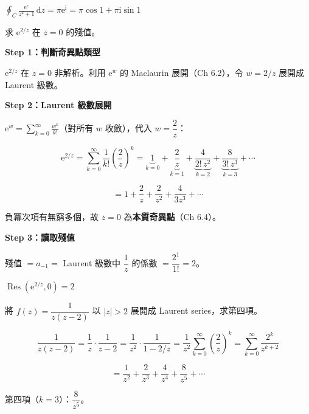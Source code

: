 \documentclass[12pt,a4paper]{article}
\newcommand{\dd}{\,\mathrm{d}}
\newcommand{\ii}{\mathrm{i}}
\newcommand{\ee}{\mathrm{e}}
\newcommand{\Res}{\operatorname{Res}}
\begin{document}
\begin{ansbox}
$\displaystyle\oint_C\frac{\ee^z}{z^2+1}\dd{z}=\boxed{\pi\ee^\ii=\pi\cos 1+\pi\ii\sin 1}$
\end{ansbox}

\begin{qbox}[第 7 題\,---\,殘值]
求 $\ee^{2/z}$ 在 $z=0$ 的殘值。
\end{qbox}

\begin{solbox}[解]
\textbf{Step 1：判斷奇異點類型}

$\ee^{2/z}$ 在 $z=0$ 非解析。利用 $\ee^w$ 的 Maclaurin 展開（Ch 6.2），令 $w=2/z$ 展開成 Laurent 級數。

\textbf{Step 2：Laurent 級數展開}

$\ee^w=\displaystyle\sum_{k=0}^{\infty}\frac{w^k}{k!}$（對所有 $w$ 收斂），代入 $w=\dfrac{2}{z}$：

$$\ee^{2/z}=\sum_{k=0}^{\infty}\frac{1}{k!}\left(\frac{2}{z}\right)^k=\underbrace{1}_{k=0}+\underbrace{\frac{2}{z}}_{k=1}+\underbrace{\frac{4}{2!\,z^2}}_{k=2}+\underbrace{\frac{8}{3!\,z^3}}_{k=3}+\cdots$$

$$=1+\frac{2}{z}+\frac{2}{z^2}+\frac{4}{3z^3}+\cdots$$

負冪次項有無窮多個，故 $z=0$ 為\textbf{本質奇異點}（Ch 6.4）。

\textbf{Step 3：讀取殘值}

殘值 $=a_{-1}=$ Laurent 級數中 $\dfrac{1}{z}$ 的係數 $=\dfrac{2^1}{1!}=2$。
\end{solbox}

\begin{ansbox}
$\Res(\ee^{2/z},0)=\boxed{2}$
\end{ansbox}

\begin{qbox}[第 8 題\,---\,Laurent 展開]
將 $f(z)=\dfrac{1}{z(z-2)}$ 以 $|z|>2$ 展開成 Laurent series，求第四項。
\end{qbox}

\begin{solbox}[解]
$$\frac{1}{z(z-2)}=\frac{1}{z}\cdot\frac{1}{z-2}=\frac{1}{z^2}\cdot\frac{1}{1-2/z}=\frac{1}{z^2}\sum_{k=0}^{\infty}\left(\frac{2}{z}\right)^k=\sum_{k=0}^{\infty}\frac{2^k}{z^{k+2}}$$

$$=\frac{1}{z^2}+\frac{2}{z^3}+\frac{4}{z^4}+\frac{8}{z^5}+\cdots$$

第四項（$k=3$）：$\dfrac{8}{z^5}$。
\end{solbox}
\end{document}
